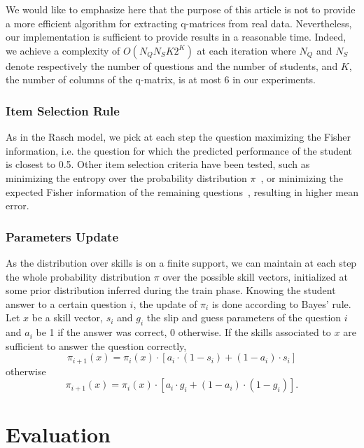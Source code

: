 \documentclass{edm_template}
\begin{document}
We would like to emphasize here that the purpose of this article is not to provide a more efficient algorithm for extracting q-matrices from real data. Nevertheless, our implementation is sufficient to provide results in a reasonable time. Indeed, we achieve a complexity of $O(N_Q N_S K 2^K)$ at each iteration where $N_Q$ and $N_S$ denote respectively the number of questions and the number of students, and $K$, the number of columns of the q-matrix, is at most 6 in our experiments.

\subsubsection{Item Selection Rule}

As in the Rasch model, we pick at each step the question maximizing the Fisher information, i.e. the question for which the predicted performance of the student is closest to 0.5. Other item selection criteria have been tested, such as minimizing the entropy over the probability distribution $\pi$~\cite{Huebner2010}, or minimizing the expected Fisher information of the remaining questions~\cite{MagisRaiche2012}, resulting in higher mean error.

\subsubsection{Parameters Update}

As the distribution over skills is on a finite support, we can maintain at each step the whole probability distribution $\pi$ over the possible skill vectors, initialized at some prior distribution inferred during the train phase.
Knowing the student answer to a certain question $i$, the update of $\pi_i$ is done according to Bayes' rule. Let $x$ be a skill vector, $s_i$ and $g_i$ the slip and guess parameters of the question $i$ and $a_i$ be 1 if the answer was correct, 0 otherwise. If the skills associated to $x$ are sufficient to answer the question correctly,
\[ \pi_{i+1}(x) = \pi_i(x) \cdot [a_i \cdot(1-s_i) + (1-a_i)\cdot s_i] \]
otherwise
\[ \pi_{i+1}(x) = \pi_i(x) \cdot [a_i \cdot g_i + (1-a_i)\cdot(1-g_i)]. \]

\section{Evaluation}
\end{document}
